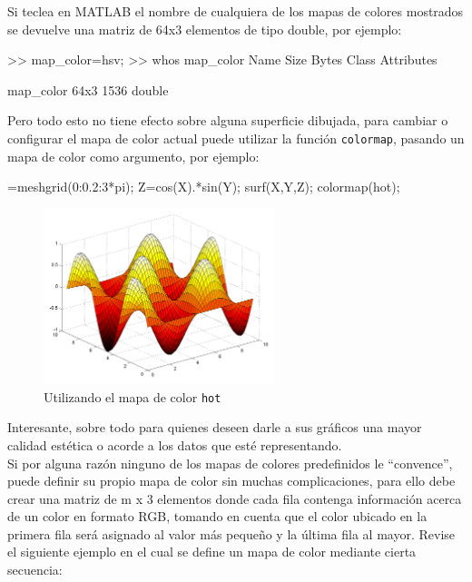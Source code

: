 Si teclea en MATLAB el nombre de cualquiera de los mapas de colores
mostrados se devuelve una matriz de 64x3 elementos de tipo double, por
ejemplo:

\begin{matlab}
>> map_color=hsv;
>> whos map_color
  Name            Size            Bytes  Class     Attributes

  map_color      64x3              1536  double          
\end{matlab}

Pero todo esto no tiene efecto sobre alguna superficie dibujada, para
cambiar o configurar el mapa de color actual puede utilizar la función
\texttt{colormap}, pasando un mapa de color como argumento, por ejemplo:

\begin{matlab}
[X,Y]=meshgrid(0:0.2:3*pi);
Z=cos(X).*sin(Y);
surf(X,Y,Z);
colormap(hot);
\end{matlab}

\begin{figure}[htbp]
    \centering
    \includegraphics[width=0.6\textwidth]{src/img/ch4/img_4_10.png}
    \caption{Utilizando el mapa de color \texttt{hot}}
    \label{fig:label}
\end{figure}

Interesante, sobre todo para quienes deseen darle a sus gráficos una
mayor calidad estética o acorde a los datos que esté representando. \\

Si por alguna razón ninguno de los mapas de colores predefinidos le
``convence'', puede definir su propio mapa de color sin muchas
complicaciones, para ello debe crear una matriz de m x 3 elementos donde
cada fila contenga información acerca de un color en formato RGB,
tomando en cuenta que el color ubicado en la primera fila será asignado
al valor más pequeño y la última fila al mayor. Revise el siguiente
ejemplo en el cual se define un mapa de color mediante cierta secuencia:

